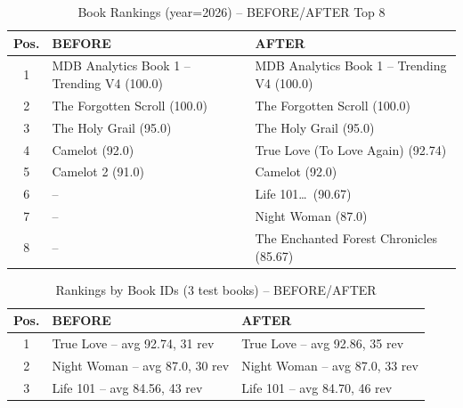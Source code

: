 \begin{table}[H]
    \centering\small
    \caption{Book Rankings (year=2026) -- BEFORE/AFTER Top 8}
    \label{tab:book_rankings_after}
    \begin{tabular}{@{}cll@{}}
        \toprule
        \textbf{Pos.} & \textbf{BEFORE} & \textbf{AFTER} \\ \midrule
        1 & MDB Analytics Book 1 -- Trending V4 (100.0) & MDB Analytics Book 1 -- Trending V4 (100.0) \\
        2 & The Forgotten Scroll (100.0)                & The Forgotten Scroll (100.0) \\
        3 & The Holy Grail (95.0)                       & The Holy Grail (95.0) \\
        4 & Camelot (92.0)                              & True Love (To Love Again) (92.74) \\
        5 & Camelot 2 (91.0)                            & Camelot (92.0) \\
        6 & --                                          & Life 101\ldots\ (90.67) \\
        7 & --                                          & Night Woman (87.0) \\
        8 & --                                          & The Enchanted Forest Chronicles (85.67) \\
        \bottomrule
    \end{tabular}
\end{table}

\begin{table}[H]
    \centering\small
    \caption{Rankings by Book IDs (3 test books) -- BEFORE/AFTER}
    \label{tab:rankings_by_ids}
    \begin{tabular}{@{}cll@{}}
        \toprule
        \textbf{Pos.} & \textbf{BEFORE} & \textbf{AFTER} \\ \midrule
        1 & True Love -- avg 92.74, 31 rev & True Love -- avg 92.86, 35 rev \\
        2 & Night Woman -- avg 87.0, 30 rev  & Night Woman -- avg 87.0, 33 rev \\
        3 & Life 101 -- avg 84.56, 43 rev    & Life 101 -- avg 84.70, 46 rev \\
        \bottomrule
    \end{tabular}
\end{table}

